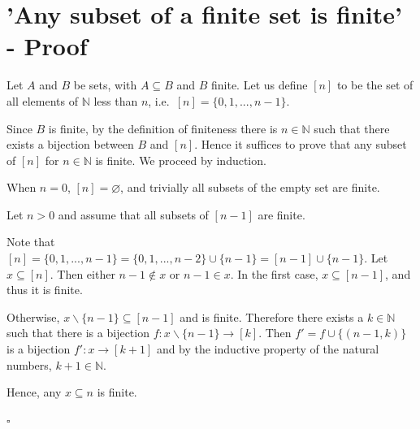 \documentclass[12pt,journal,duplex]{IEEEtran}
\begin{document}
\section{'Any subset of a finite set is finite' - Proof}
Let $A$ and $B$ be sets, with $A \subseteq B$ and $B$ finite. Let us define $[n]$ to be the set of all elements of $\mathbb{N}$ less than $n$, i.e.~$[n] = \{0,1,...,n-1\}$.

Since $B$ is finite, by the definition of finiteness there is $n \in \mathbb{N}$ such that there exists a bijection between $B$ and $[n]$. Hence it suffices to prove that any subset of $[n]$ for $n \in \mathbb{N}$ is finite. We proceed by induction.

When $n = 0$, $[n] = \varnothing$, and trivially all subsets of the empty set are finite.

Let $n > 0$ and assume that all subsets of $[n-1]$ are finite.

Note that $[n] = \{0,1,...,n-1\} = \{0,1,...,n-2\} \cup \{n-1\} = [n-1] \cup \{n-1\}$. Let $x \subseteq [n]$. Then either $n-1 \notin x$ or $n-1\in x$. In the first case, $x \subseteq [n-1]$, and thus it is finite.

Otherwise, $x\backslash\{n-1\} \subseteq [n-1]$ and is finite. Therefore there exists a $k \in \mathbb{N}$ such that there is a bijection $f: x\backslash\{n-1\} \rightarrow [k]$. Then $f' = f \cup \{(n-1, k)\}$ is a bijection $f': x \rightarrow [k+1]$ and by the inductive property of the natural numbers, $k+1 \in \mathbb{N}$.

Hence, any $x \subseteq n$ is finite.

$\square$

\end{document}
